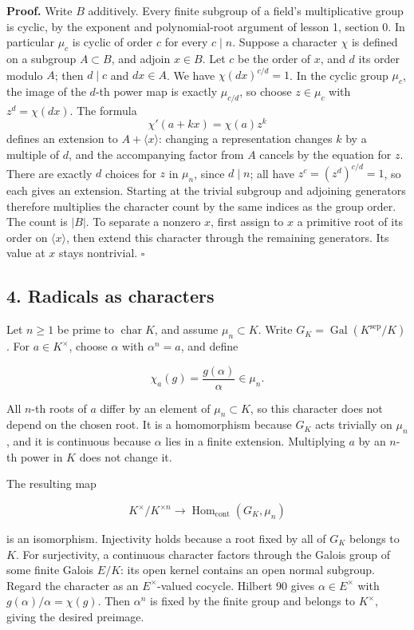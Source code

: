 \documentclass[11pt,a4paper]{article}
\begin{document}
\textbf{Proof.} Write \(B\) additively. Every finite subgroup of a
field's multiplicative group is cyclic, by the exponent and
polynomial-root argument of lesson 1, section 0. In particular \(\mu_c\)
is cyclic of order \(c\) for every \(c\mid n\). Suppose a character
\(\chi\) is defined on a subgroup \(A\subset B\), and adjoin \(x\in B\).
Let \(c\) be the order of \(x\), and \(d\) its order modulo \(A\); then
\(d\mid c\) and \(dx\in A\). We have \(\chi(dx)^{c/d}=1\). In the cyclic
group \(\mu_c\), the image of the \(d\)-th power map is exactly
\(\mu_{c/d}\), so choose \(z\in\mu_c\) with \(z^d=\chi(dx)\). The
formula \[
\chi'(a+kx)=\chi(a)z^k
\] defines an extension to \(A+\langle x\rangle\): changing a
representation changes \(k\) by a multiple of \(d\), and the
accompanying factor from \(A\) cancels by the equation for \(z\). There
are exactly \(d\) choices for \(z\) in \(\mu_n\), since \(d\mid n\); all
have \(z^c=(z^d)^{c/d}=1\), so each gives an extension. Starting at the
trivial subgroup and adjoining generators therefore multiplies the
character count by the same indices as the group order. The count is
\(|B|\). To separate a nonzero \(x\), first assign to \(x\) a primitive
root of its order on \(\langle x\rangle\), then extend this character
through the remaining generators. Its value at \(x\) stays nontrivial.
\(\square\)

\subsection{4. Radicals as characters}\label{radicals-as-characters}

Let \(n\geq1\) be prime to \(\operatorname{char}K\), and assume
\(\mu_n\subset K\). Write
\(G_K=\operatorname{Gal}(K^{\mathrm{sep}}/K)\). For \(a\in K^\times\),
choose \(\alpha\) with \(\alpha^n=a\), and define

\[
\chi_a(g)=\frac{g(\alpha)}{\alpha}\in\mu_n.
\]

All \(n\)-th roots of \(a\) differ by an element of \(\mu_n\subset K\),
so this character does not depend on the chosen root. It is a
homomorphism because \(G_K\) acts trivially on \(\mu_n\), and it is
continuous because \(\alpha\) lies in a finite extension. Multiplying
\(a\) by an \(n\)-th power in \(K\) does not change it.

The resulting map

\[
K^\times/K^{\times n}\longrightarrow
\operatorname{Hom}_{\mathrm{cont}}(G_K,\mu_n)
\]

is an isomorphism. Injectivity holds because a root fixed by all of
\(G_K\) belongs to \(K\). For surjectivity, a continuous character
factors through the Galois group of some finite Galois \(E/K\): its open
kernel contains an open normal subgroup. Regard the character as an
\(E^\times\)-valued cocycle. Hilbert 90 gives \(\alpha\in E^\times\)
with \(g(\alpha)/\alpha=\chi(g)\). Then \(\alpha^n\) is fixed by the
finite group and belongs to \(K^\times\), giving the desired preimage.
\end{document}
